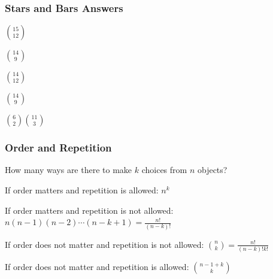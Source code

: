\documentclass{beamer}
\newenvironment{packed_enum}{
\begin{enumerate}
  \setlength{\itemsep}{1pt}
  \setlength{\parskip}{0pt}
  \setlength{\parsep}{0pt}
}{\end{enumerate}}
\begin{document}
\frame
{
  \frametitle{Stars and Bars Answers}


\vfill
\begin{packed_enum}
\item $\binom{15}{12}$ %
\item $\binom{14}{9}$ %
\item $\binom{14}{12}$ %
\item $\binom{14}{9}$ %
\item $\binom{6}{2}\binom{11}{3}$ %
\end{packed_enum}


}


\frame
{
  \frametitle{Order and Repetition}
  How many ways are there to make $k$ choices from $n$ objects?

If order matters and repetition is allowed: $n^k$ \vfill

If order matters and repetition is not allowed: $n(n-1)(n-2)\cdots(n-k+1)=\frac{n!}{(n-k)!}$\vfill

If order does not matter and repetition is not allowed: $\binom{n}{k}=\frac{n!}{(n-k)!k!}$\vfill

If order does not matter and repetition is allowed:  $\binom{n-1+k}{k}$\vfill


}

\end{document}
